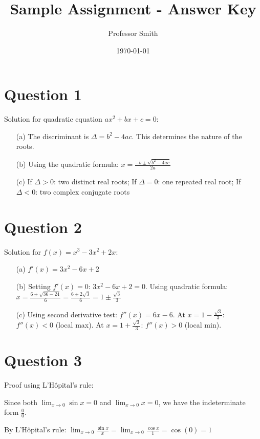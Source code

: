 \documentclass{article}
\title{Sample Assignment - Answer Key}
\author{Professor Smith}
\date{\today}
\begin{document}
\maketitle

\section{Question 1}
Solution for quadratic equation $ax^2 + bx + c = 0$:

\begin{enumerate}
    \item[(a)] The discriminant is $\Delta = b^2 - 4ac$. This determines the nature of the roots.
    \item[(b)] Using the quadratic formula: $x = \frac{-b \pm \sqrt{b^2 - 4ac}}{2a}$
    \item[(c)] If $\Delta > 0$: two distinct real roots; If $\Delta = 0$: one repeated real root; If $\Delta < 0$: two complex conjugate roots
\end{enumerate}

\section{Question 2}
Solution for $f(x) = x^3 - 3x^2 + 2x$:

\begin{enumerate}
    \item[(a)] $f'(x) = 3x^2 - 6x + 2$
    \item[(b)] Setting $f'(x) = 0$: $3x^2 - 6x + 2 = 0$. Using quadratic formula: $x = \frac{6 \pm \sqrt{36-24}}{6} = \frac{6 \pm 2\sqrt{3}}{6} = 1 \pm \frac{\sqrt{3}}{3}$
    \item[(c)] Using second derivative test: $f''(x) = 6x - 6$. At $x = 1 - \frac{\sqrt{3}}{3}$: $f''(x) < 0$ (local max). At $x = 1 + \frac{\sqrt{3}}{3}$: $f''(x) > 0$ (local min).
\end{enumerate}

\section{Question 3}
Proof using L'Hôpital's rule:

Since both $\lim_{x \to 0} \sin x = 0$ and $\lim_{x \to 0} x = 0$, we have the indeterminate form $\frac{0}{0}$.

By L'Hôpital's rule: $\lim_{x \to 0} \frac{\sin x}{x} = \lim_{x \to 0} \frac{\cos x}{1} = \cos(0) = 1$
\end{document}
